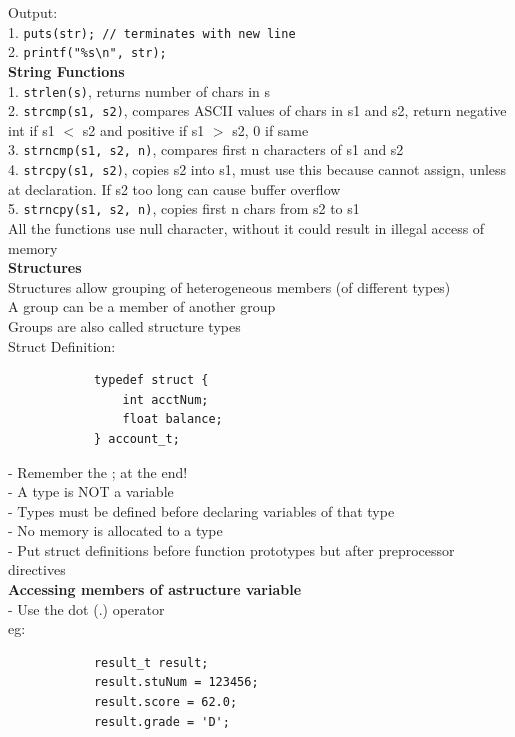\documentclass[10pt, a4paper]{article}
\begin{document}
\begin{multicols*}{3}
 		Output:\\
		1. \texttt{puts(str); // terminates with new line}\\
		2. \texttt{printf("\%s\textbackslash n", str); }\\
		
		\textbf{String Functions}\\
		1. \texttt{strlen(s)}, returns number of chars in s\\
		2. \texttt{strcmp(s1, s2)}, compares ASCII values of chars in s1 and s2, return negative int if s1 $<$ s2 and positive if s1 $>$ s2, 0 if same\\
		3. \texttt{strncmp(s1, s2, n)}, compares first n characters of s1 and s2\\
		4. \texttt{strcpy(s1, s2)}, copies s2 into s1, must use this because cannot assign, unless at declaration. If s2 too long can cause buffer overflow\\
		5. \texttt{strncpy(s1, s2, n)}, copies first n chars from s2 to s1\\
		All the functions use null character, without it could result in illegal access of memory\\
		
		\textbf{Structures}\\
		Structures allow grouping of heterogeneous members (of different types)\\
		A group can be a member of another group\\
		Groups are also called structure types\\
		
		Struct Definition:
		\begin{verbatim}
			typedef struct {
			    int acctNum;
			    float balance;
			} account_t;
		\end{verbatim}
		- Remember the ; at the end!\\
		- A type is NOT a variable\\
		- Types must be defined before declaring variables of that type\\
		- No memory is allocated to a type\\
		- Put struct definitions before function prototypes but after preprocessor directives\\
		
		\textbf{Accessing members of astructure variable}\\
		- Use the dot (.) operator\\
		eg:
		\begin{verbatim}
			result_t result;
			result.stuNum = 123456;
			result.score = 62.0;
			result.grade = 'D';
			

\end{verbatim}
\end{multicols*}
\end{document}
